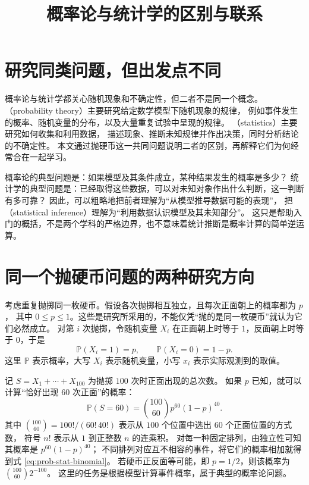\documentclass[UTF8]{ctexart}
\title{概率论与统计学的区别与联系}
\author{}
\date{}
\begin{document}
\maketitle

\section{研究同类问题，但出发点不同}
\label{sec:prob-stat-distinction}

概率论与统计学都关心随机现象和不确定性，但二者不是同一个概念。
（probability theory）主要研究给定数学模型下随机现象的规律，
例如事件发生的概率、随机变量的分布，以及大量重复试验中呈现的规律。
（statistics）主要研究如何收集和利用数据，
描述现象、推断未知规律并作出决策，同时分析结论的不确定性。
本文通过抛硬币这一共同问题说明二者的区别，再解释它们为何经常合在一起学习。

概率论的典型问题是：如果模型及其条件成立，某种结果发生的概率是多少？
统计学的典型问题是：已经取得这些数据，可以对未知对象作出什么判断，这一判断有多可靠？
因此，可以粗略地把前者理解为“从模型推导数据可能的表现”，
把（statistical inference）理解为“利用数据认识模型及其未知部分”。
这只是帮助入门的概括，不是两个学科的严格边界，也不意味着统计推断是概率计算的简单逆运算。

\section{同一个抛硬币问题的两种研究方向}
\label{sec:prob-stat-coin}

考虑重复抛掷同一枚硬币。假设各次抛掷相互独立，且每次正面朝上的概率都为 $p$，
其中 $0\leq p\leq1$。这些是研究所采用的，不能仅凭“抛的是同一枚硬币”就认为它们必然成立。
对第 $i$ 次抛掷，令随机变量 $X_i$ 在正面朝上时等于 $1$，反面朝上时等于 $0$，于是
\[
  \mathbb P(X_i=1)=p,\qquad \mathbb P(X_i=0)=1-p.
\]
这里 $\mathbb P$ 表示概率，大写 $X_i$ 表示随机变量，小写 $x_i$ 表示实际观测到的取值。

\begin{example}
\label{ex:prob-stat-forward}
记 $S=X_1+\cdots+X_{100}$ 为抛掷 $100$ 次时正面出现的总次数。
如果 $p$ 已知，就可以计算“恰好出现 $60$ 次正面”的概率：
\begin{equation}
  \mathbb P(S=60)=\binom{100}{60}p^{60}(1-p)^{40}.
  \label{eq:prob-stat-binomial}
\end{equation}
其中 $\binom{100}{60}=100!/(60!\,40!)$ 表示从 $100$ 个位置中选出 $60$ 个正面位置的方式数，
符号 $n!$ 表示从 $1$ 到正整数 $n$ 的连乘积。
对每一种固定排列，由独立性可知其概率是 $p^{60}(1-p)^{40}$；
不同排列对应互不相容的事件，将它们的概率相加就得到式 \eqref{eq:prob-stat-binomial}。
若硬币正反面等可能，即 $p=1/2$，则该概率为 $\binom{100}{60}2^{-100}$。
这里的任务是根据模型计算事件概率，属于典型的概率论问题。
\end{example}
\end{document}
